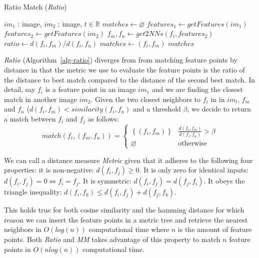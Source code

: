 \begin{algorithm}[htb]
\caption{Ratio Match (\emph{Ratio})}
\label{alg-ratio}
\begin{algorithmic}
\Require $im_1$ : image, $im_2$ : image, $t \in \mathbb{R}$
\State $matches\gets \varnothing$
\State $features_1 \gets getFeatures(im_1)$
\State $features_2 \gets getFeatures(im_2)$
    \State $f_m,f_n \gets get2NNs(f_i, features_2)$
    \State $ratio \gets d(f_i, f_m) / d(f_i, f_n)$
        \State $matches \gets \left(f_i, f_m\right)$
	\EndIf
\EndFor
\Return $matches$
\end{algorithmic}
\end{algorithm}

\emph{Ratio} (Algorithm~\ref{alg-ratio}) \cite{lowe2004sift} diverges 
from from matching feature points by distance in that the metric we use 
to evaluate the feature points is the ratio of the distance to best 
match compared to the distance of the second best match. In detail, say 
$f_i$ is a feature point in an image $im_1$ and we are finding the 
closest match in another image $im_2$. Given the two closest neighbors 
to $f_i$ in in $im_l$, $f_m$ and $f_n$ ($d(f_i,f_m) < 
similarity(f_i,f_n)$ and a threshold $\beta$, we decide to return a 
match between $f_i$ and $f_j$ as follows:
\begin{equation*}
    match(f_i,(f_m,f_n)) = \begin{cases}
        \left\{(f_i,f_m)\right\} &
        \frac{d(f_i,f_m)}{d(f_i,f_n)} > \beta \\ \varnothing & 
        \mbox{otherwise}
    \end{cases}
\end{equation*}

We can call a distance measure \emph{Metric} given that it adheres to 
the following four properties: it is non-negative: $d(f_i,f_j) \geq 0$.  
It is only zero for identical inputs: $d(f_i,f_j) = 0 \Leftrightarrow 
f_i = f_j$. It is symmetric: $d(f_i,f_j) = d(f_j,f_i)$. It obeys the 
triangle inequality: $d(f_i,f_k) \leq d(f_i,f_j) + d(f_j,f_k)$.

This holds true for both cosine similarity and the hamming distance for 
which reason we can insert the feature points in a metric tree and 
retrieve the nearest neighbors in $O(log(n))$ computational time where 
$n$ is the amount of feature points.  Both \emph{Ratio} and \emph{MM} 
takes advantage of this property to match $n$ feature points in 
$O(nlog(n))$ computational time.


